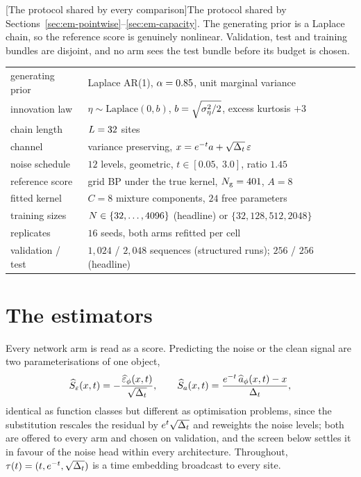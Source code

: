 \begin{center}
\begin{minipage}{\linewidth}\small\centering
{}[The protocol shared by every comparison]{The protocol shared
by Sections~\ref{sec:em-pointwise}--\ref{sec:em-capacity}. The generating
prior is a Laplace chain, so the reference score is genuinely nonlinear.
Validation, test and training bundles are disjoint, and no arm sees the test
bundle before its budget is chosen.}
\label{tab:em-protocol}
\begin{tabular}{@{}ll@{}}
\toprule
generating prior & Laplace AR(1), $\alpha = 0.85$, unit marginal variance \\
innovation law & $\eta \sim \mathrm{Laplace}(0, b)$, $b = \sqrt{\sigma_\eta^2/2}$, excess kurtosis $+3$ \\
chain length & $L = 32$ sites \\
channel & variance preserving, $x = e^{-t}a + \sqrt{\Delta_t}\,\varepsilon$ \\
noise schedule & $12$ levels, geometric, $t \in [0.05,\ 3.0]$, ratio $1.45$ \\
reference score & grid BP under the true kernel, $N_{\mathrm{g}} = 401$, $A = 8$ \\
fitted kernel & $C = 8$ mixture components, $24$ free parameters \\
training sizes & $N \in \{32, \dots, 4096\}$ (headline) or $\{32,128,512,2048\}$ \\
replicates & $16$ seeds, both arms refitted per cell \\
validation / test & $1{,}024$ / $2{,}048$ sequences (structured runs); $256$ / $256$ (headline) \\
\bottomrule
\end{tabular}
\end{minipage}
\end{center}

\section{The estimators}\label{sec:em-estimators}\label{sec:em-archs}

Every network arm is read as a score. Predicting the noise or the clean
signal are two parameterisations of one object,
\begin{equation}
  \widehat{S}_\varepsilon(x,t) = -\frac{\widehat{\varepsilon}_\phi(x,t)}{\sqrt{\Delta_t}},
  \qquad
  \widehat{S}_{a}(x,t) = \frac{e^{-t}\,\widehat{a}_\phi(x,t) - x}{\Delta_t},
  \label{eq:em-parameterisation}
\end{equation}
identical as function classes but different as optimisation problems, since
the substitution rescales the residual by $e^{t}\sqrt{\Delta_t}$ and reweights
the noise levels; both are offered to every arm and chosen on validation, and
the screen below settles it in favour of the noise head within every
architecture. Throughout, $\tau(t) = (t, e^{-t}, \sqrt{\Delta_t})$ is a time
embedding broadcast to every site.

